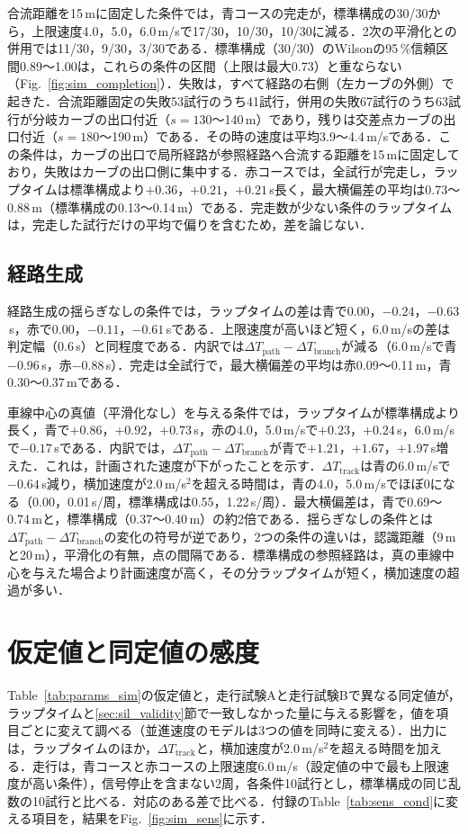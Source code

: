 合流距離を15\,mに固定した条件では，青コースの完走が，標準構成の30/30から，上限速度4.0，5.0，6.0\,m/sで17/30，10/30，10/30に減る．2次の平滑化との併用では11/30，9/30，3/30である．標準構成（30/30）のWilsonの95\,\%信頼区間0.89〜1.00は，これらの条件の区間（上限は最大0.73）と重ならない（Fig.~\ref{fig:sim_completion}）．失敗は，すべて経路の右側（左カーブの外側）で起きた．合流距離固定の失敗53試行のうち41試行，併用の失敗67試行のうち63試行が分岐カーブの出口付近（$s=130$〜140\,m）であり，残りは交差点カーブの出口付近（$s=180$〜190\,m）である．その時の速度は平均3.9〜4.4\,m/sである．この条件は，カーブの出口で局所経路が参照経路へ合流する距離を15\,mに固定しており，失敗はカーブの出口側に集中する．赤コースでは，全試行が完走し，ラップタイムは標準構成より$+0.36$，$+0.21$，$+0.21$\,s長く，最大横偏差の平均は0.73〜0.88\,m（標準構成の0.13〜0.14\,m）である．完走数が少ない条件のラップタイムは，完走した試行だけの平均で偏りを含むため，差を論じない．

\subsection{経路生成}
経路生成の揺らぎなしの条件では，ラップタイムの差は青で0.00，$-0.24$，$-0.63$\,s，赤で0.00，$-0.11$，$-0.61$\,sである．上限速度が高いほど短く，6.0\,m/sの差は判定幅（0.6\,s）と同程度である．内訳では$\Delta T_{\mathrm{path}}-\Delta T_{\mathrm{branch}}$が減る（6.0\,m/sで青$-0.96$\,s，赤$-0.88$\,s）．完走は全試行で，最大横偏差の平均は赤0.09〜0.11\,m，青0.30〜0.37\,mである．

車線中心の真値（平滑化なし）を与える条件では，ラップタイムが標準構成より長く，青で$+0.86$，$+0.92$，$+0.73$\,s，赤の4.0，5.0\,m/sで$+0.23$，$+0.24$\,s，6.0\,m/sで$-0.17$\,sである．内訳では，$\Delta T_{\mathrm{path}}-\Delta T_{\mathrm{branch}}$が青で$+1.21$，$+1.67$，$+1.97$\,s増えた．これは，計画された速度が下がったことを示す．$\Delta T_{\mathrm{track}}$は青の6.0\,m/sで$-0.64$\,s減り，横加速度が2.0\,m/s$^2$を超える時間は，青の4.0，5.0\,m/sでほぼ0になる（0.00，0.01\,s/周，標準構成は0.55，1.22\,s/周）．最大横偏差は，青で0.69〜0.74\,mと，標準構成（0.37〜0.40\,m）の約2倍である．揺らぎなしの条件とは$\Delta T_{\mathrm{path}}-\Delta T_{\mathrm{branch}}$の変化の符号が逆であり，2つの条件の違いは，認識距離（9\,mと20\,m），平滑化の有無，点の間隔である．標準構成の参照経路は，真の車線中心を与えた場合より計画速度が高く，その分ラップタイムが短く，横加速度の超過が多い．

\section{仮定値と同定値の感度}
\label{sec:sil_sens}
Table~\ref{tab:params_sim}の仮定値と，走行試験Aと走行試験Bで異なる同定値が，ラップタイムと\ref{sec:sil_validity}節で一致しなかった量に与える影響を，値を項目ごとに変えて調べる（並進速度のモデルは3つの値を同時に変える）．出力には，ラップタイムのほか，$\Delta T_{\mathrm{track}}$と，横加速度が2.0\,m/s$^2$を超える時間を加える．走行は，青コースと赤コースの上限速度6.0\,m/s（設定値の中で最も上限速度が高い条件），信号停止を含まない2周，各条件10試行とし，標準構成の同じ乱数の10試行と比べる．対応のある差で比べる．付録のTable~\ref{tab:sens_cond}に変える項目を，結果をFig.~\ref{fig:sim_sens}に示す．

